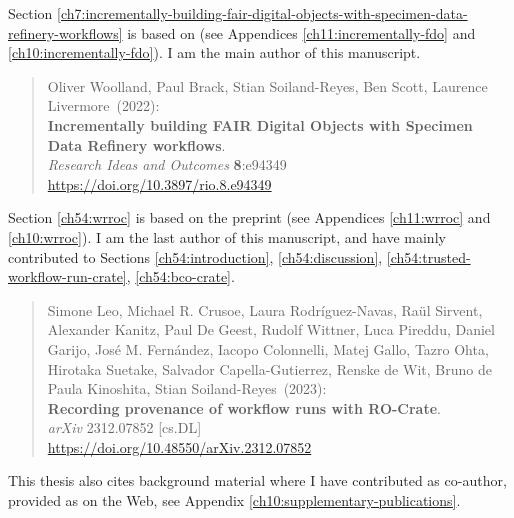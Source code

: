 Section \ref{ch7:incrementally-building-fair-digital-objects-with-specimen-data-refinery-workflows} is based on \cite{Woolland 2022} (see Appendices \ref{ch11:incrementally-fdo} and \ref{ch10:incrementally-fdo}). I am the main author of this manuscript.

\begin{quote}
    \small
    Oliver Woolland, Paul Brack, Stian Soiland-Reyes, Ben Scott, Laurence Livermore~(2022): \\
    \textbf{Incrementally building FAIR Digital Objects with Specimen Data Refinery workflows}.\\
    \emph{Research Ideas and Outcomes} \textbf{8}:e94349\\
    \url{https://doi.org/10.3897/rio.8.e94349}    
\end{quote}

Section \ref{ch54:wrroc} is based on the preprint \cite{Leo 2023b} (see Appendices \ref{ch11:wrroc} and \ref{ch10:wrroc}). I am the last author of this manuscript, and have mainly contributed to Sections \ref{ch54:introduction}, \ref{ch54:discussion}, \ref{ch54:trusted-workflow-run-crate}, \ref{ch54:bco-crate}.

\begin{quote}
    \small
    Simone Leo, Michael R. Crusoe, Laura Rodríguez-Navas, Raül Sirvent, Alexander Kanitz, Paul De Geest, Rudolf Wittner, Luca Pireddu, Daniel Garijo, José M. Fernández, Iacopo Colonnelli, Matej Gallo, Tazro Ohta, Hirotaka Suetake, Salvador Capella-Gutierrez, Renske de Wit, Bruno de Paula Kinoshita, Stian Soiland-Reyes~(2023): \\
    \textbf{Recording provenance of workflow runs with RO-Crate}.\\
    \emph{arXiv} 2312.07852 [cs.DL] \\
    \url{https://doi.org/10.48550/arXiv.2312.07852}\\
\end{quote}

This thesis also cites background material where I have contributed as co-author, provided as  on the Web, see Appendix \vref{ch10:supplementary-publications}.